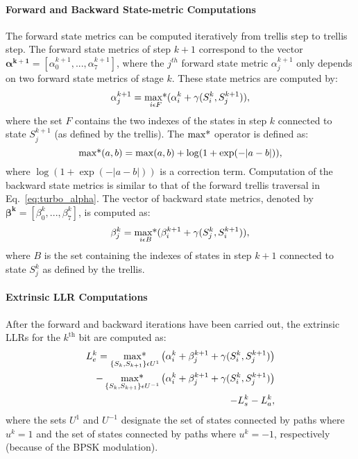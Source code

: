 \paragraph{Forward and Backward State-metric Computations}

The forward state metrics can be computed iteratively from trellis step to
trellis step. The forward state metrics of step $k+1$ correspond to the vector
$\bm{\alpha^{k+1}} = [\alpha_0^{k+1}, ... ,\alpha_7^{k+1}]$, where the
$j^{th}$ forward state metric $\alpha_j^{k+1}$ only depends on two forward
state metrics of stage $k$. These state metrics are computed by:
\begin{equation}
  \label{eq:turbo_alpha}
  \alpha_j^{k+1} =
  \operatorname*{max*}_{i \epsilon F} ( \alpha_i^k + \gamma(S_i^k, S_j^{k+1}) ),
\end{equation}
where the set $F$ contains the two indexes of the states in step $k$ connected
to state $S_j^{k+1}$ (as defined by the trellis). The $\operatorname*{max*}$ operator is
defined as:
\begin{equation}
   \operatorname*{max*}(a,b) = \max(a,b) + \log(1 + \exp(-|a-b|)),
\end{equation}
where $\log(1 + \exp(-|a-b|))$ is a correction term.
Computation of the backward state metrics is similar to that of the forward
trellis traversal in Eq.~\ref{eq:turbo_alpha}. The vector of backward state
metrics, denoted by $\bm{\beta^k} = [\beta_0^k, ..., \beta_7^k]$, is
computed as:
\begin{equation}
  \label{eq:turbo_beta}
  \beta_j^k =
  \operatorname*{max*}_{i \epsilon B} ( \beta_i^{k+1} + \gamma(S_j^k, S_i^{k+1}) ),
\end{equation}
where $B$ is the set containing the indexes of states in step $k+1$ connected to
state $S_j^k$ as defined by the trellis.

\paragraph{Extrinsic LLR Computations}

After the forward and backward iterations have been carried out, the extrinsic
LLRs for the $k^\text{th}$ bit are computed as:
\begin{equation}
  \label{eq:turbo_ext}
  \begin{aligned}
  L_e^k = \operatorname*{max*}_{\{S_k, S_{k+1}\}\epsilon U^1}\big( \alpha_i^k + \beta_j^{k+1} +
  \gamma(S_i^k, S_j^{k+1}) \big) \\
  - \operatorname*{max*}_{\{S_k, S_{k+1}\}\epsilon U^{-1}}\big( \alpha_i^k + \beta_j^{k+1} +
  \gamma(S_i^k, S_j^{k+1}) \big) \\
  - L_{s}^k - L_a^k,
  \end{aligned}
\end{equation}
where the sets $U^1$ and $U^{-1}$ designate the set of states connected by paths
where $u^k=1$ and the set of states connected by paths where $u^k=-1$,
respectively (because of the BPSK modulation).

